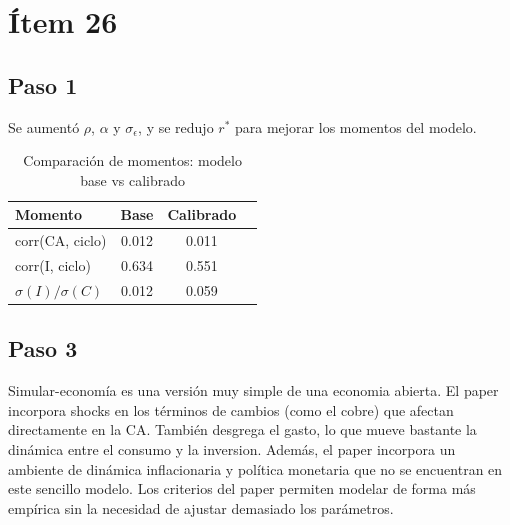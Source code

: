 \section*{Ítem 26}

\subsection*{Paso 1}

Se aumentó $\rho$, $\alpha$ y $\sigma_\epsilon$, y se redujo $r^*$ para mejorar los momentos del modelo.

\begin{table}[H]
\centering
\caption{Comparación de momentos: modelo base vs calibrado}
\begin{tabular}{lccc}
\toprule
Momento & Base & Calibrado \\
\midrule
corr(CA, ciclo) & 0.012 & 0.011 \\
corr(I, ciclo) & 0.634 & 0.551 \\
$\sigma(I)/\sigma(C)$ & 0.012 & 0.059 \\
\bottomrule
\end{tabular}
\end{table}

\subsection*{Paso 3}

Simular-economía es una versión muy simple de una economia abierta. El paper incorpora shocks en los términos de cambios (como el cobre) que afectan directamente en la CA. También desgrega el gasto, lo que mueve bastante la dinámica entre el consumo y la inversion. Además, el paper incorpora un ambiente de dinámica inflacionaria y política monetaria que no se encuentran en este sencillo modelo.  Los criterios del paper permiten modelar de forma más empírica sin la necesidad de ajustar demasiado los parámetros.

